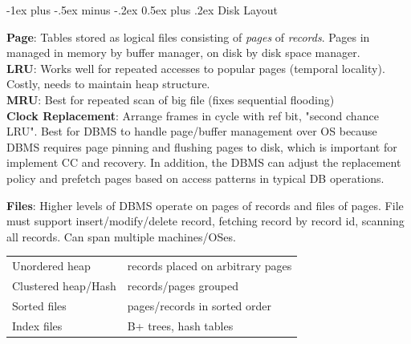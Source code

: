 \documentclass[10pt,landscape]{article}
\makeatletter
\renewcommand{\section}{\@startsection{section}{1}{0mm}%
                                {-1ex plus -.5ex minus -.2ex}%
                                {0.5ex plus .2ex}%
                                {\normalfont\large\bfseries}}
\makeatother
\begin{document}
\begin{multicols}{3}
%
%
%
%


\section{Disk Layout}

\textbf{Page}: Tables stored as logical files consisting of \textit{pages} of \textit{records}. Pages in managed in memory by buffer manager, on disk by disk space manager. \\
\textbf{LRU}: Works well for repeated accesses to popular pages (temporal locality). Costly, needs to maintain heap structure. \\
\textbf{MRU}: Best for repeated scan of big file (fixes sequential flooding) \\
\textbf{Clock Replacement}: Arrange frames in cycle with ref bit, "second chance LRU". Best for DBMS to handle page/buffer management over OS because DBMS requires page pinning and flushing pages to disk, which is important for implement CC and recovery. In addition, the DBMS can adjust the replacement policy and prefetch pages based on access patterns in typical DB operations.

\textbf{Files}: Higher levels of DBMS operate on pages of records and files of pages. File must support insert/modify/delete record, fetching record by record id, scanning all records. Can span multiple machines/OSes.

\begin{tabular}{@{}ll@{}}
Unordered heap      & records placed on arbitrary pages \\
Clustered heap/Hash & records/pages grouped \\
Sorted files        & pages/records in sorted order \\
Index files         & B+ trees, hash tables
\end{tabular}


\end{multicols}
\end{document}
